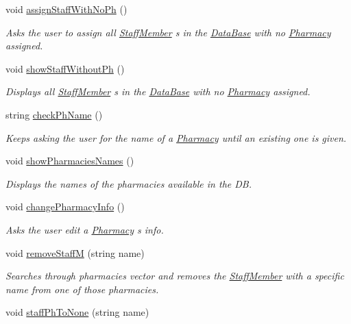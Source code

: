 \begin{DoxyCompactItemize}
void \hyperlink{classDataBase_a28237a8f74d11c092cf250d17c7997f1}{assign\+Staff\+With\+No\+Ph} ()
\begin{DoxyCompactList}\small\item\em Asks the user to assign all \hyperlink{classStaffMember}{Staff\+Member} \textquotesingle{}s in the \hyperlink{classDataBase}{Data\+Base} with no \hyperlink{classPharmacy}{Pharmacy} assigned. \end{DoxyCompactList}\item 
void \hyperlink{classDataBase_ab17fba12d1810b3548615b3ac0427850}{show\+Staff\+Without\+Ph} ()
\begin{DoxyCompactList}\small\item\em Displays all \hyperlink{classStaffMember}{Staff\+Member} \textquotesingle{}s in the \hyperlink{classDataBase}{Data\+Base} with no \hyperlink{classPharmacy}{Pharmacy} assigned. \end{DoxyCompactList}\item 
string \hyperlink{classDataBase_a33b218c5674029a4696a44d710f88aa6}{check\+Ph\+Name} ()
\begin{DoxyCompactList}\small\item\em Keeps asking the user for the name of a \hyperlink{classPharmacy}{Pharmacy} until an existing one is given. \end{DoxyCompactList}\item 
void \hyperlink{classDataBase_ac572ac9a3091e0adcef16ab79bfba7fb}{show\+Pharmacies\+Names} ()
\begin{DoxyCompactList}\small\item\em Displays the names of the pharmacies available in the DB. \end{DoxyCompactList}\item 
void \hyperlink{classDataBase_a9704dec1b0797bf3f6dc18a754a4a1b5}{change\+Pharmacy\+Info} ()
\begin{DoxyCompactList}\small\item\em Asks the user edit a \hyperlink{classPharmacy}{Pharmacy} \textquotesingle{}s info. \end{DoxyCompactList}\item 
void \hyperlink{classDataBase_a79dbf45f9b1a60fd5a29505f44e188e0}{remove\+StaffM} (string name)
\begin{DoxyCompactList}\small\item\em Searches through pharmacies vector and removes the \hyperlink{classStaffMember}{Staff\+Member} with a specific name from one of those pharmacies. \end{DoxyCompactList}\item 
void \hyperlink{classDataBase_a85445c22323399e318780faf36854c2f}{staff\+Ph\+To\+None} (string name)
\end{DoxyCompactItemize}

